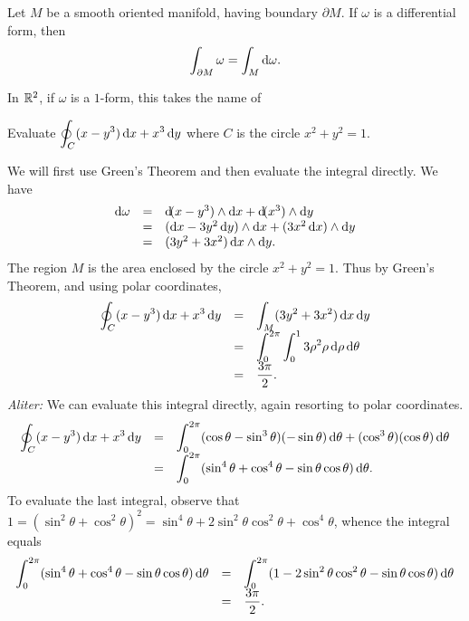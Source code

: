 \begin{thm}
Let $M$ be a smooth oriented manifold, having boundary $\partial
M$. If $\omega$ is a differential form, then
$$\dint _{\partial M} \omega = \dint _{M} \d{\omega} .$$
\end{thm}
In $\mathbb{R}^2$, if $\omega$ is a $1$-form, this takes the name of
\begin{exa}
Evaluate $\doint _C (x - y^3)\d{x}+ x^3\d{y}$ where  $C$ is the
circle $x^2 + y^2 = 1$.
\end{exa}
\begin{solu} We will first use Green's Theorem and then evaluate the
integral directly. We have
$$\begin{array}{lll}\d{\omega} &  = &  \d (x - y^3) \wedge \d{x}+ \d (x^3) \wedge \d{y}\\
& = & (\d{x}- 3y^2\d{y})\wedge \d{x}+ (3x^2\d{x})\wedge \d{y} \\
& = & (3y^2 + 3x^2) \d{x}\wedge \d{y}.
\end{array}$$
The region $M$ is the area enclosed by the circle $x^2 + y^2 = 1. $
Thus by Green's Theorem, and using polar coordinates,
$$\begin{array}{lll}\doint _C (x - y^3)\d{x}+ x^3\d{y} & = &
\dint _M (3y^2 + 3x^2) \d{x}\d{y} \\
& = & \dint _0 ^{2\pi} \dint _0 ^1 3\rho^2 \rho \d{\rho} \d{\theta}
\\
& = & \dfrac{3\pi}{2}. \end{array}$$ {\em Aliter:} We can evaluate
this integral directly, again resorting to polar coordinates.
$$\begin{array}{lll}\doint _C (x - y^3)\d{x}+ x^3\d{y} & = &
\dint _0 ^{2\pi} (\cos\theta -\sin^3\theta)(-\sin\theta)\d{\theta} + (\cos^3\theta)(\cos\theta)\d{\theta} \\
& = & \dint _0 ^{2\pi} (\sin^4\theta + \cos^4\theta -
\sin\theta\cos\theta)\d{\theta}.
\end{array}$$
To evaluate the last integral, observe that $1 = (\sin^2\theta +
\cos^2\theta )^2 = \sin^4\theta + 2\sin^2\theta\cos^2\theta +
\cos^4\theta$, whence the integral equals
$$\begin{array}{lll}
\dint _0 ^{2\pi} (\sin^4\theta + \cos^4\theta -
\sin\theta\cos\theta)\d{\theta} & = & \dint _0 ^{2\pi} (1 -
2\sin^2\theta\cos^2\theta  - \sin\theta\cos\theta)\d{\theta} \\
& = & \dfrac{3\pi}{2}.
\end{array}$$
\end{solu}


